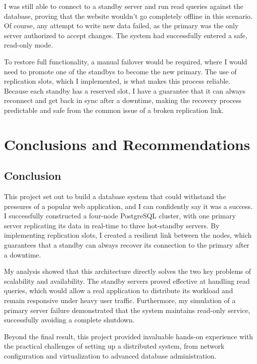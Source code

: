 \documentclass[conference]{IEEEtran}
\begin{document}
I was still able to connect to a standby server and run read queries against the database, proving that the website wouldn't go completely offline in this scenario. Of course, any attempt to write new data failed, as the primary was the only server authorized to accept changes. The system had successfully entered a safe, read-only mode.

To restore full functionality, a manual failover would be required, where I would need to promote one of the standbys to become the new primary. The use of replication slots, which I implemented, is what makes this process reliable. Because each standby has a reserved slot, I have a guarantee that it can always reconnect and get back in sync after a downtime, making the recovery process predictable and safe from the common issue of a broken replication link.

\section{Conclusions and Recommendations}

\subsection{Conclusion}

This project set out to build a database system that could withstand the pressures of a popular web application, and I can confidently say it was a success. I successfully constructed a four-node PostgreSQL cluster, with one primary server replicating its data in real-time to three hot-standby servers. By implementing replication slots, I created a resilient link between the nodes, which guarantees that a standby can always recover its connection to the primary after a downtime.

My analysis showed that this architecture directly solves the two key problems of scalability and availability. The standby servers proved effective at handling read queries, which would allow a real application to distribute its workload and remain responsive under heavy user traffic. Furthermore, my simulation of a primary server failure demonstrated that the system maintains read-only service, successfully avoiding a complete shutdown.

Beyond the final result, this project provided invaluable hands-on experience with the practical challenges of setting up a distributed system, from network configuration and virtualization to advanced database administration.
\end{document}
